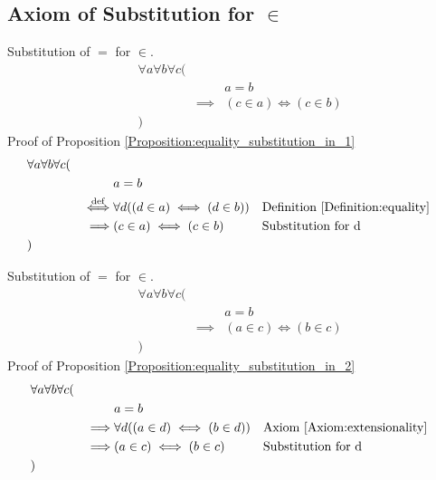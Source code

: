 \subsection{Axiom of Substitution for $\in$}
\begin{prop}
\label{Proposition:equality_substitution_in_1}
Substitution of $=$ for $\in$.
\begin{align*}
& \forall a \forall b \forall c ( \\
& & & a = b \\
& & \implies & (c \in a) \iff (c \in b) \\
& )
\end{align*}
Proof of Proposition \ref{Proposition:equality_substitution_in_1}
\begin{align*}
& \forall a \forall b \forall c ( \\
& & & a = b \\
& & \overset{\operatorname{def}}{\iff} & \forall d ((d \in a) \iff (d \in b))
& & \text{Definition \ref{Definition:equality}} \\
& & \implies & (c \in a) \iff (c \in b)
& & \text{Substitution for d} \\
& )
\end{align*}
\end{prop}

\begin{prop}
\label{Proposition:equality_substitution_in_2}
Substitution of $=$ for $\in$.
\begin{align*}
& \forall a \forall b \forall c ( \\
& & & a = b \\
& & \implies & (a \in c) \iff (b \in c) \\
& )
\end{align*}
Proof of Proposition \ref{Proposition:equality_substitution_in_2}
\begin{align*}
& \forall a \forall b \forall c ( \\
& & & a = b \\
& & \implies & \forall d ((a \in d) \iff (b \in d))
& & \text{Axiom \ref{Axiom:extensionality}} \\
& & \implies & (a \in c) \iff (b \in c)
& & \text{Substitution for d} \\
& )
\end{align*}
\end{prop}

